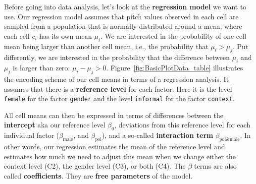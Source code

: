 \documentclass[nobib]{tufte-handout}
\newcommand{\tr}[1]{\textcolor{DarkOrange}{[tr: #1]}}
\begin{document}
Before going into data analysis, let's look at the \textbf{regression model} we want to use.
%
%
Our regression model assumes that pitch values observed in each cell are
sampled from a population that is normally distributed around a mean, where each cell $c_i$ has its own mean $\mu_i$. We are interested in the probability of one cell mean being larger than another cell mean, i.e., the probability that $\mu_i > \mu_j$. Put differently, we are interested in the probability that the difference between $\mu_i$ and $\mu_j$ is larger than zero: $\mu_i - \mu_j > 0$.
Figure~\ref{fig:BasicPlotData_table} illustrates the encoding scheme of our cell means in terms of a regression analysis. It assumes that
there is a \textbf{reference level} for each factor. Here it is the level \texttt{female} for
the factor \texttt{gender} and the level \texttt{informal} for the factor
\texttt{context}. 
  
All cell means can then be expressed in terms of differences between the \textbf{intercept} aka our reference level
$\beta_0$, deviations from this reference level for each individual factor
($\beta_{\text{male}}$, and $\beta_{\text{pol}}$), and a so-called \textbf{interaction term}
$\beta_{\text{pol\&male}}$. In
other words, our regression estimates the mean of the reference level and estimates how much we
need to adjust this mean when we change either the context level (C2), the gender level (C3),
or both (C4). The $\beta$ terms are also called \textbf{coefficients}. They are \textbf{free parameters} of the model.

\end{document}
